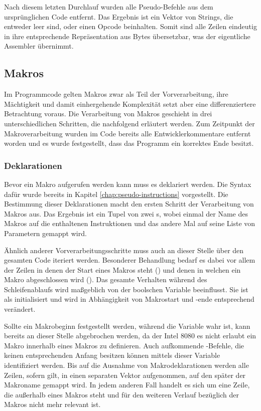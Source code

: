 Nach diesem letzten Durchlauf wurden alle Pseudo-Befehle aus dem ursprünglichen Code entfernt. Das Ergebnis ist ein Vektor von Strings, die entweder leer sind, oder einen Opcode beinhalten. Somit sind alle Zeilen eindeutig in ihre entsprechende Repräsentation aus Bytes übersetzbar, was der eigentliche Assembler übernimmt.

\subsection{Makros}\label{chap:macros}

Im Programmcode gelten Makros zwar als Teil der Vorverarbeitung, ihre Mächtigkeit und damit einhergehende Komplexität setzt aber eine differenziertere Betrachtung voraus. Die Verarbeitung von Makros geschieht in drei unterschiedlichen Schritten, die nachfolgend erläutert werden. Zum Zeitpunkt der Makroverarbeitung wurden im Code bereits alle Entwicklerkommentare entfernt worden und es wurde festgestellt, dass das Programm ein korrektes Ende besitzt.

\subsubsection{Deklarationen}

Bevor ein Makro aufgerufen werden kann muss es deklariert werden. Die Syntax dafür wurde bereits in Kapitel \ref{chap:pseudo-instructions} vorgestellt. Die Bestimmung dieser Deklarationen macht den ersten Schritt der Verarbeitung von Makros aus. Das Ergebnis ist ein Tupel von zwei s, wobei einmal der Name des Makros auf die enthaltenen Instruktionen und das andere Mal auf seine Liste von Parametern gemappt wird.

Ähnlich anderer Vorverarbeitungsschritte muss auch an dieser Stelle über den gesamten Code iteriert werden. Besonderer Behandlung bedarf es dabei vor allem der Zeilen in denen der Start eines Makros steht () und denen in welchen ein Makro abgeschlossen wird (). Das gesamte Verhalten während des Schleifenablaufs wird maßgeblich von der boolschen Variable  beeinflusst. Sie ist als  initialisiert und wird in Abhängigkeit von Makrostart und -ende entsprechend verändert. 

Sollte ein Makrobeginn festgestellt werden, während die Variable wahr ist, kann bereits an dieser Stelle abgebrochen werden, da der Intel 8080 es nicht erlaubt ein Makro innerhalb eines Makros zu definieren. Auch aufkommende -Befehle, die keinen entsprechenden Anfang besitzen können mittels dieser Variable identifiziert werden. Bis auf die Ausnahme von Makrodeklarationen werden alle Zeilen, sofern  gilt, in einen separaten Vektor aufgenommen, auf den später der Makroname gemappt wird. In jedem anderen Fall handelt es sich um eine Zeile, die außerhalb eines Makros steht und für den weiteren Verlauf bezüglich der Makros nicht mehr relevant ist.

